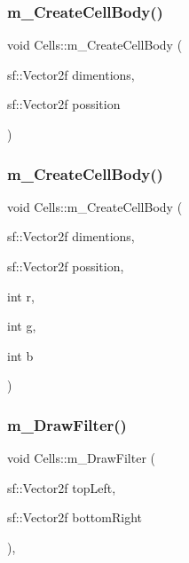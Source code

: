 \subsubsection{\texorpdfstring{m\+\_\+\+Create\+Cell\+Body()}{m\_CreateCellBody()}\hspace{0.1cm}{\footnotesize\ttfamily [1/2]}}
{\footnotesize\ttfamily void Cells\+::m\+\_\+\+Create\+Cell\+Body (\begin{DoxyParamCaption}\item[{sf\+::\+Vector2f}]{dimentions,  }\item[{sf\+::\+Vector2f}]{possition }\end{DoxyParamCaption})}

\mbox{\label{class_cells_a6405637a987f8af6210518d21b284c5d}} 
\subsubsection{\texorpdfstring{m\+\_\+\+Create\+Cell\+Body()}{m\_CreateCellBody()}\hspace{0.1cm}{\footnotesize\ttfamily [2/2]}}
{\footnotesize\ttfamily void Cells\+::m\+\_\+\+Create\+Cell\+Body (\begin{DoxyParamCaption}\item[{sf\+::\+Vector2f}]{dimentions,  }\item[{sf\+::\+Vector2f}]{possition,  }\item[{int}]{r,  }\item[{int}]{g,  }\item[{int}]{b }\end{DoxyParamCaption})}

\mbox{\label{class_cells_a9c7eea82ba5ab8a840bbdcc0be25200f}} 
\subsubsection{\texorpdfstring{m\+\_\+\+Draw\+Filter()}{m\_DrawFilter()}}
{\footnotesize\ttfamily void Cells\+::m\+\_\+\+Draw\+Filter (\begin{DoxyParamCaption}\item[{sf\+::\+Vector2f}]{top\+Left,  }\item[{sf\+::\+Vector2f}]{bottom\+Right }\end{DoxyParamCaption})\hspace{0.3cm}{\ttfamily [override]}, {\ttfamily [virtual]}}



